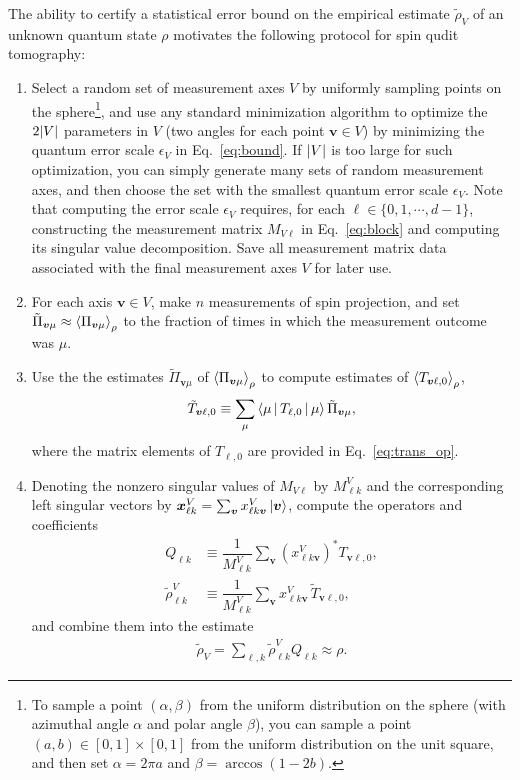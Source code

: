 \documentclass[nofootinbib,twocolumn]{revtex4-1}
\newcommand{\f}[2]{\dfrac{#1}{#2}} %
\newcommand{\p}[1]{\left(#1\right)} %
\newcommand{\bk}{\Braket} %
\renewcommand{\set}[1]{\{#1\}} %
\begin{document}
The ability to certify a statistical error bound on the empirical estimate $\tilde\rho_V$ of an unknown quantum state $\rho$ motivates the following protocol for spin qudit tomography:
\begin{enumerate}
\item Select a random set of measurement axes $V$ by uniformly sampling points on the sphere\footnote{To sample a point $\p{\alpha,\beta}$ from the uniform distribution on the sphere (with azimuthal angle $\alpha$ and polar angle $\beta$), you can sample a point $\p{a,b}\in[0,1]\times[0,1]$ from the uniform distribution on the unit square, and then set $\alpha=2\pi a$ and $\beta=\arccos\p{1-2b}$.}, and use any standard minimization algorithm to optimize the $2\abs{V}$ parameters in $V$ (two angles for each point $\bm v\in V$) by minimizing the quantum error scale $\epsilon_V$ in Eq.~\eqref{eq:bound}.
If $\abs{V}$ is too large for such optimization, you can simply generate many sets of random measurement axes, and then choose the set with the smallest quantum error scale $\epsilon_V$.
Note that computing the error scale $\epsilon_V$ requires, for each $\ell\in\set{0,1,\cdots,d-1}$, constructing the measurement matrix $M_{V\ell}$ in Eq.~\eqref{eq:block} and computing its singular value decomposition.
Save all measurement matrix data associated with the final measurement axes $V$ for later use.
\item For each axis $\bm v\in V$, make $n$ measurements of spin projection, and set $\tilde\Pi_{\bm v\mu}\approx\bk{\Pi_{\bm v\mu}}_\rho$ to the fraction of times in which the measurement outcome was $\mu$.
\item Use the the estimates $\tilde\Pi_{\bm v\mu}$ of $\bk{\Pi_{\bm v\mu}}_\rho$ to compute estimates of $\bk{T_{\bm v\ell,0}}_\rho$,
\begin{align}
  \tilde T_{\bm v\ell,0}
  \equiv \sum_\mu \bk{\mu|T_{\ell,0}|\mu} \tilde\Pi_{\bm v\mu},
\end{align}
where the matrix elements of $T_{\ell,0}$ are provided in Eq.~\eqref{eq:trans_op}.
\item Denoting the nonzero singular values of $M_{V\ell}$ by $M^V_{\ell k}$ and the corresponding left singular vectors by $\bm x^V_{\ell k} = \sum_{\bm v} x^V_{\ell k \bm v} \ket{\bm v}$, compute the  operators and coefficients
\begin{align}
  Q_{\ell k} &\equiv \f1{M^V_{\ell k}} \sum_{\bm v}
  \p{x^V_{\ell k\bm v}}^* T_{\bm v\ell,0}, \\
  \tilde\rho^V_{\ell k} &\equiv \f1{M^V_{\ell k}} \sum_{\bm v}
  x^V_{\ell k\bm v} \, \tilde T_{\bm v\ell,0},
\end{align}
and combine them into the estimate
\begin{align}
  \tilde\rho_V = \sum_{\ell,k} \tilde\rho^V_{\ell k} Q_{\ell k}
  \approx \rho.
\end{align}
\end{enumerate}
\end{document}
